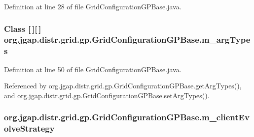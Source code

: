Definition at line 28 of file Grid\-Configuration\-G\-P\-Base.\-java.

\hypertarget{classorg_1_1jgap_1_1distr_1_1grid_1_1gp_1_1_grid_configuration_g_p_base_a3a929cfdf3dcf84b23bff20e2c56a1e5}{
\subsubsection[{m\-\_\-arg\-Types}]{\setlength{\rightskip}{0pt plus 5cm}Class \mbox{[}$\,$\mbox{]}\mbox{[}$\,$\mbox{]} org.\-jgap.\-distr.\-grid.\-gp.\-Grid\-Configuration\-G\-P\-Base.\-m\-\_\-arg\-Types\hspace{0.3cm}{\ttfamily [private]}}}\label{classorg_1_1jgap_1_1distr_1_1grid_1_1gp_1_1_grid_configuration_g_p_base_a3a929cfdf3dcf84b23bff20e2c56a1e5}


Definition at line 50 of file Grid\-Configuration\-G\-P\-Base.\-java.



Referenced by org.\-jgap.\-distr.\-grid.\-gp.\-Grid\-Configuration\-G\-P\-Base.\-get\-Arg\-Types(), and org.\-jgap.\-distr.\-grid.\-gp.\-Grid\-Configuration\-G\-P\-Base.\-set\-Arg\-Types().

\hypertarget{classorg_1_1jgap_1_1distr_1_1grid_1_1gp_1_1_grid_configuration_g_p_base_a04f4dea0aaafad6113137c71db1d105e}{
\subsubsection[{m\-\_\-client\-Evolve\-Strategy}]{ org.\-jgap.\-distr.\-grid.\-gp.\-Grid\-Configuration\-G\-P\-Base.\-m\-\_\-client\-Evolve\-Strategy\hspace{0.3cm}{\ttfamily [private]}}}\label{classorg_1_1jgap_1_1distr_1_1grid_1_1gp_1_1_grid_configuration_g_p_base_a04f4dea0aaafad6113137c71db1d105e}


